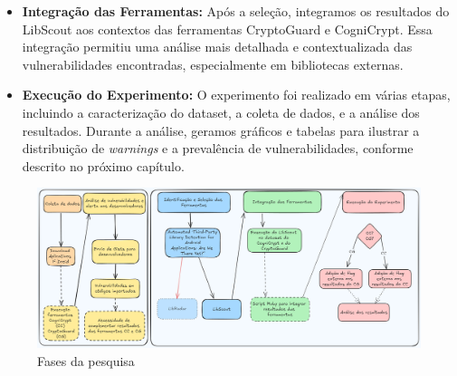 \begin{itemize}
\item \textbf{Integração das Ferramentas:} Após a seleção, integramos os resultados do LibScout aos contextos das ferramentas CryptoGuard e CogniCrypt. Essa integração permitiu uma análise mais detalhada e contextualizada das vulnerabilidades encontradas, especialmente em bibliotecas externas.

\item \textbf{Execução do Experimento:} O experimento foi realizado em várias etapas, incluindo a caracterização do dataset, a coleta de dados, e a análise dos resultados. Durante a análise, geramos gráficos e tabelas para ilustrar a distribuição de \textit{warnings} e a prevalência de vulnerabilidades, conforme descrito no próximo capítulo.

\end{itemize}

\begin{figure}[!ht]
  \centering
  \includegraphics[scale=0.7]{img/research_steps.png}
  \caption{Fases da pesquisa}
  \label{img: research_steps}
\end{figure}
